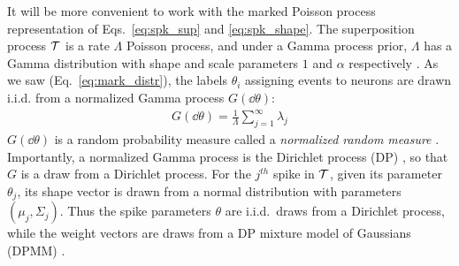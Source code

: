 It will be more convenient to work with the marked Poisson process representation of Eqs.~\ref{eq:spk_sup} and \ref{eq:spk_shape}. 
The superposition process $\mathcal{T}$ is a rate $\Lambda$ Poisson process,
and under a Gamma process prior, $\Lambda$ has a Gamma distribution with shape and scale parameters $1$ and $\alpha$ respectively \citep{Ferguson73}.
As we saw (Eq.~\eqref{eq:mark_distr}), the labels $\theta_i$ assigning events to neurons are drawn i.i.d. from a normalized Gamma 
process $G(\dd \theta)$:
\begin{align}
 G(\dd \theta) = \frac{1}{\Lambda} \sum_{j=1}^{\infty} \lambda_j
\end{align}
$G(\dd \theta)$ is a random probability measure called a \emph{normalized random measure} \citep{JamesLP09}. Importantly, a 
normalized Gamma process is the Dirichlet process (DP) \citep{Ferguson73}, so that $G$ is a draw from a Dirichlet process. For the $j^{th}$ spike in $\mathcal{T}$, given its 
parameter $\theta_j$, its shape vector is drawn from a normal distribution
with parameters $(\mu_{j}, \Sigma_{j})$. Thus the spike parameters $\theta$ are i.i.d.\ draws from a Dirichlet process, while the weight vectors are
draws from a DP mixture model of Gaussians (DPMM) \citep{Lo1984}.

